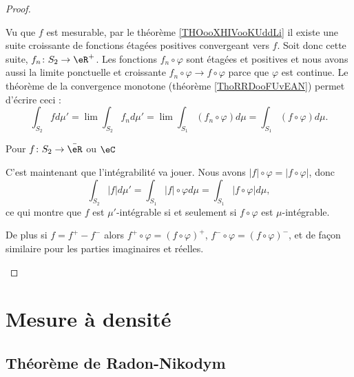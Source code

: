 \begin{proof}
\begin{subproof}
            Vu que \( f\) est mesurable, par le théorème \ref{THOooXHIVooKUddLi} il existe une suite croissante de fonctions étagées positives convergeant vers \( f\). Soit donc cette suite, \( f_n\colon S_2\to \eR^+\). Les fonctions \( f_n\circ\varphi\) sont étagées et positives et nous avons aussi la limite ponctuelle et croissante \( f_n\circ\varphi\to f\circ\varphi\) parce que \( \varphi\) est continue. Le théorème de la convergence monotone (théorème \ref{ThoRRDooFUvEAN}) permet d'écrire ceci :
            \begin{equation}
                \int_{S_2}fd\mu'=\lim\int_{S_2}f_nd\mu'= \lim\int_{S_1}(f_n\circ\varphi)d\mu=\int_{S_1}(f\circ\varphi)d\mu.
            \end{equation}
        \item[Pour \( f\colon S_2\to \bar \eR\) ou \( \eC\) ]
            
            C'est maintenant que l'intégrabilité va jouer. Nous avons \( | f |\circ\varphi=| f\circ\varphi |\), donc
            \begin{equation}
                \int_{S_2}| f |d\mu'=\int_{S_1}| f |\circ\varphi d\mu=\int_{S_1}| f\circ \varphi |d\mu,
            \end{equation}
            ce qui montre que \( f\) est \( \mu'\)-intégrable si et seulement si \( f\circ\varphi\) est \( \mu\)-intégrable.

            De plus si \(f=f^+-f^- \) alors \( f^+\circ\varphi=(f\circ\varphi)^+\), \( f^-\circ\varphi=(f\circ\varphi)^-\), et de façon similaire pour les parties imaginaires et réelles.
    \end{subproof}
\end{proof}

\section{Mesure à densité}

\subsection{Théorème de Radon-Nikodym}

